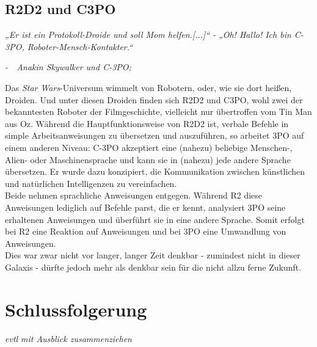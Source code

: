 \documentclass[12pt,twoside]{article}
\theoremstyle{plain}
\theoremstyle{definition}
\theoremstyle{remark}
\begin{document}
\subsection{R2D2 und C3PO}
\label{ssec:r2d2}
\textit{„Er ist ein Protokoll-Droide und soll Mom helfen.[...]“ - „Oh! Hallo! Ich bin C-3PO, Roboter-Mensch-Kontakter.“}
\begin{flushright}
    \textit{-~~Anakin Skywalker und C-3PO; \cite{SWEP1}}
\end{flushright}
Das \textit{Star Wars}-Universum wimmelt von Robotern, oder, wie sie dort heißen, Droiden.
Und unter diesen Droiden finden sich R2D2 und C3PO, wohl zwei der bekanntesten Roboter der Filmgeschichte, vielleicht nur übertroffen vom Tin Man aus Oz.
Während die Hauptfunktionsweise von R2D2 ist, verbale Befehle in simple Arbeitsanweisungen zu übersetzen und auszuführen, so arbeitet 3PO auf einem anderen Niveau:
C-3PO akzeptiert eine (nahezu) beliebige Menschen-, Alien- oder Maschinensprache und kann sie in (nahezu) jede andere Sprache übersetzen.
Er wurde dazu konzipiert, die Kommunikation zwischen künstlichen und natürlichen Intelligenzen zu vereinfachen.\\
Beide nehmen sprachliche Anweisungen entgegen.
Während R2 diese Anweisungen lediglich auf Befehle parst, die er kennt, analysiert 3PO seine erhaltenen Anweisungen und überführt sie in eine andere Sprache.
Somit erfolgt bei R2 eine Reaktion auf Anweisungen und bei 3PO eine Umwandlung von Anweisungen.\\
Dies war zwar nicht vor langer, langer Zeit denkbar - zumindest nicht in dieser Galaxis - dürfte jedoch mehr als denkbar sein für die nicht allzu ferne Zukunft.

\section{Schlussfolgerung}
\label{sec:concl}
\textit{evtl mit Ausblick zusammenziehen}



%
%
\newpage


\nocite{*}
\end{document}

